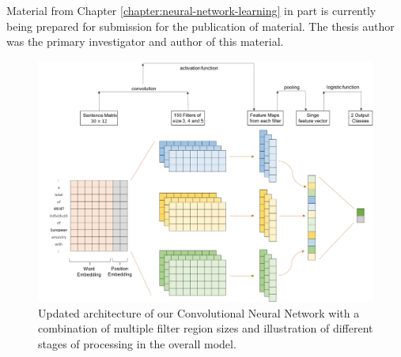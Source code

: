 Material from Chapter \ref{chapter:neural-network-learning} in part is currently being prepared for submission for the publication of material. The thesis author was the primary investigator and author of this material. 


\begin{figure}[b]
    \centering
    \includegraphics[width=\linewidth]{Images/Complete-CNN-Framework.png}
    \caption{Updated architecture of our Convolutional Neural Network with a combination of multiple filter region sizes and illustration of different stages of processing in the overall model.}
    \label{figure:complete-cnn-framework}
\end{figure}